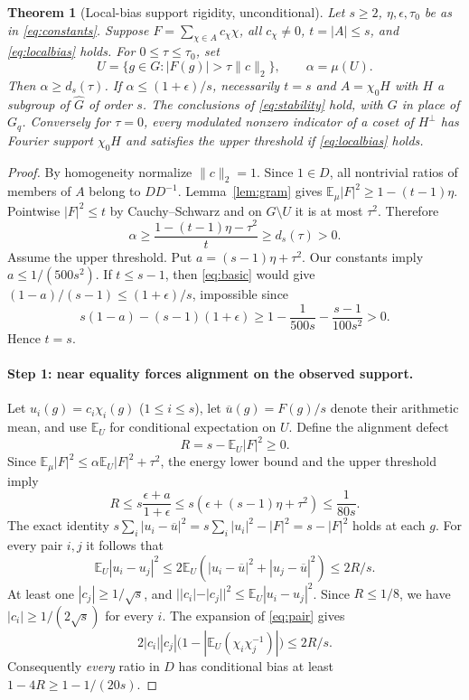 \documentclass[11pt]{article}
\newtheorem{theorem}{Theorem}[section]
\theoremstyle{definition}\newtheorem{remark}[theorem]{Remark}
\newcommand{\E}{\mathbb E}
\newcommand{\norm}[1]{\lVert #1\rVert}
\begin{document}
\begin{theorem}[Local-bias support rigidity, unconditional]\label{thm:finite}
Let $s\ge2$, $\eta,\epsilon,\tau_0$ be as in \eqref{eq:constants}. Suppose $F=\sum_{\chi\in A}c_\chi\chi$, all $c_\chi\ne0$, $t=|A|\le s$, and \eqref{eq:localbias} holds. For $0\le\tau\le\tau_0$, set
\[
 U=\{g\in G:|F(g)|>\tau\norm c_2\},\qquad\alpha=\mu(U).
\]
Then $\alpha\ge d_s(\tau)$. If $\alpha\le(1+\epsilon)/s$, necessarily $t=s$ and $A=\chi_0H$ with $H$ a subgroup of $\widehat G$ of order $s$. The conclusions of \eqref{eq:stability} hold, with $G$ in place of $G_q$. Conversely for $\tau=0$, every modulated nonzero indicator of a coset of $H^\perp$ has Fourier support $\chi_0H$ and satisfies the upper threshold if \eqref{eq:localbias} holds.
\end{theorem}
\begin{proof}
By homogeneity normalize $\norm c_2=1$. Since $1\in D$, all nontrivial ratios of members of $A$ belong to $DD^{-1}$. Lemma~\ref{lem:gram} gives $\E_\mu|F|^2\ge1-(t-1)\eta$. Pointwise $|F|^2\le t$ by Cauchy--Schwarz and on $G\setminus U$ it is at most $\tau^2$. Therefore
\begin{equation}\label{eq:basic}
 \alpha\ge\frac{1-(t-1)\eta-\tau^2}{t}\ge d_s(\tau)>0.
\end{equation}
Assume the upper threshold. Put $a=(s-1)\eta+\tau^2$. Our constants imply $a\le1/(500s^2)$. If $t\le s-1$, then \eqref{eq:basic} would give $(1-a)/(s-1)\le(1+\epsilon)/s$, impossible since
\[
 s(1-a)-(s-1)(1+\epsilon)\ge1-\frac1{500s}-\frac{s-1}{100s^2}>0.
\]
Hence $t=s$.

\paragraph{Step 1: near equality forces alignment on the observed support.}
Let $u_i(g)=c_i\chi_i(g)$ ($1\le i\le s$), let $\overline u(g)=F(g)/s$ denote their arithmetic mean, and use $\E_U$ for conditional expectation on $U$. Define the alignment defect
\[
 R=s-\E_U|F|^2\ge0.
\]
Since $\E_\mu|F|^2\le \alpha\E_U|F|^2+\tau^2$, the energy lower bound and the upper threshold imply
\begin{equation}\label{eq:defect}
 R\le s\frac{\epsilon+a}{1+\epsilon}
 \le s(\epsilon+(s-1)\eta+\tau^2)\le\frac1{80s}.
\end{equation}
The exact identity $s\sum_i|u_i-\overline u|^2=s\sum_i|u_i|^2-|F|^2=s-|F|^2$ holds at each $g$. For every pair $i,j$ it follows that
\begin{equation}\label{eq:pair}
 \E_U|u_i-u_j|^2\le2\E_U(|u_i-\overline u|^2+|u_j-\overline u|^2)\le 2R/s.
\end{equation}
At least one $|c_j|\ge1/\sqrt s$, and $||c_i|-|c_j||^2\le\E_U|u_i-u_j|^2$. Since $R\le1/8$, we have $|c_i|\ge1/(2\sqrt s)$ for every $i$. The expansion of \eqref{eq:pair} gives
\[
 2|c_i||c_j|\bigl(1-|\E_U(\chi_i\chi_j^{-1})|\bigr)\le2R/s.
\]
Consequently \emph{every} ratio in $D$ has conditional bias at least $1-4R\ge1-1/(20s)$.


\end{proof}
\end{document}
